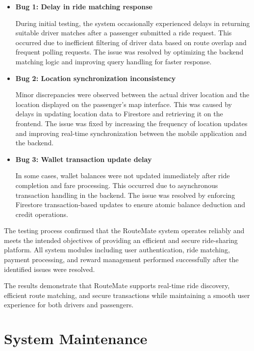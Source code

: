 \documentclass[10pt,a4paper]{report}
\begin{document}
\begin{itemize}

\item \textbf{Bug 1: Delay in ride matching response}

During initial testing, the system occasionally experienced delays in returning suitable driver matches
after a passenger submitted a ride request. This occurred due to inefficient filtering of driver data
based on route overlap and frequent polling requests. The issue was resolved by optimizing the backend
matching logic and improving query handling for faster response.

\item \textbf{Bug 2: Location synchronization inconsistency}

Minor discrepancies were observed between the actual driver location and the location displayed on the
passenger’s map interface. This was caused by delays in updating location data to Firestore and retrieving
it on the frontend. The issue was fixed by increasing the frequency of location updates and improving
real-time synchronization between the mobile application and the backend.

\item \textbf{Bug 3: Wallet transaction update delay}

In some cases, wallet balances were not updated immediately after ride completion and fare processing.
This occurred due to asynchronous transaction handling in the backend. The issue was resolved by enforcing
Firestore transaction-based updates to ensure atomic balance deduction and credit operations.

\end{itemize}

\justify\large The testing process confirmed that the RouteMate system operates reliably and meets the
intended objectives of providing an efficient and secure ride-sharing platform. All system modules
including user authentication, ride matching, payment processing, and reward management performed
successfully after the identified issues were resolved.

\justify\large The results demonstrate that RouteMate supports real-time ride discovery, efficient route
matching, and secure transactions while maintaining a smooth user experience for both drivers and passengers.




\newpage
\chapter{System Maintenance}
\end{document}
